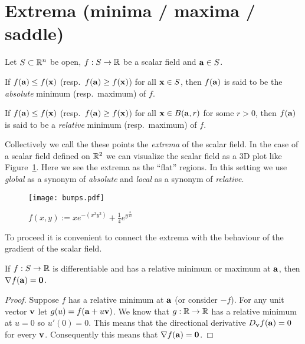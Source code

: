 \section{Extrema (minima / maxima / saddle)}

Let \(S\subset \bR^n\) be open,
\(f:S \to \bR\) be a scalar field
and \(\aa \in S\).

\begin{definition}
    If \(f(\aa)\leq f(\xx)\) (resp.\ \(f(\aa)\geq f(\xx)\)) for all \(\xx \in S\), then \(f(\aa)\) is said to be the \emph{absolute} minimum (resp.\ maximum) of \(f\).
\end{definition}

\begin{definition}
    If \(f(\aa)\leq f(\xx)\) (resp.\ \(f(\aa)\geq f(\xx)\)) for all \(\xx \in B(\aa,r)\) for some \(r>0\), then \(f(\aa)\) is said to be a \emph{relative} minimum (resp.\ maximum) of \(f\).
\end{definition}

Collectively we call the these points the \emph{extrema} of the scalar field.
In the case of a scalar field defined on \(\bR^2\) we can visualize the scalar field as a 3D plot like Figure~\ref{fig:bumps}.
Here we see the extrema as the ``flat'' regions.
In this setting we use \emph{global} as a synonym of \emph{absolute} and \emph{local} as a synonym of \emph{relative}.


\begin{figure}[htb]
    \begin{center}
        \texttt{[image: bumps.pdf]}
        \caption{$f(x,y) := x e^{-(x^2y^2)}  + \frac{1}{4}e^{y^\frac{3}{10}}$}
        \label{fig:bumps}
    \end{center}
\end{figure}

To proceed it is convenient to connect the extrema with the behaviour of the gradient of the scalar field.

\begin{theorem}
    If \(f:S\to\bR\) is differentiable and has a relative minimum or maximum at \(\aa\), then \(\nabla f(\aa)=  \mathbf{0}\).
\end{theorem}

\begin{proof}
    Suppose \(f\) has a relative minimum at \(\aa\) (or consider \(-f\)).
    For any unit vector \(\vv\) let \(g(u) = f(\aa+u\vv)\).
    We know that \(g:\bR \to \bR\) has a relative minimum at \(u=0\) so \(u'(0)=0\).
    This means that the directional derivative \(D_{\vv} f(\aa) = 0\) for every \(\vv\).
    Consequently this means that \(\nabla f (\aa)= \mathbf{0}\).
\end{proof}

